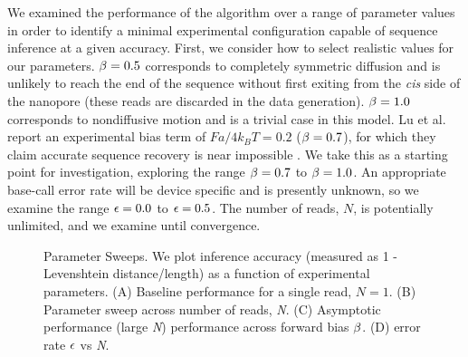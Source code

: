 \documentclass{biophys_letter}
\begin{document}
We examined the performance of the algorithm over a range of parameter values in order to identify a minimal experimental configuration capable of sequence inference at a given accuracy.
First, we consider how to select realistic values for our parameters.
$\beta=0.5$ corresponds to completely symmetric diffusion and is unlikely to reach the end of the sequence without first exiting from the {\it cis} side of the nanopore (these reads are discarded in the data generation).
$\beta=1.0$ corresponds to nondiffusive motion and is a trivial case in this model.
Lu et al. report an experimental bias term of $Fa/4k_{B}T=0.2$ ($\beta=0.7$), for which they claim accurate sequence recovery is near impossible \cite{Lu:2011}.
We take this as a starting point for investigation, exploring the range $\beta=0.7$ to $\beta=1.0$.
An appropriate base-call error rate will be device specific and is presently unknown, so we examine the range $\epsilon=0.0$ to $\epsilon=0.5$.
The number of reads, $N$, is potentially unlimited, and we examine until convergence.

\begin{figure}
  \caption{Parameter Sweeps. We plot inference accuracy (measured as 1 - Levenshtein distance/length) as a function of experimental parameters. (A) Baseline performance for a single read, $N=1$. (B) Parameter sweep across number of reads, \emph{N}. (C) Asymptotic performance (large \emph{N}) performance across forward bias $\beta$. (D) error rate $\epsilon$ vs \emph{N}.}
\label{fig:parameter_sweeps}
\end{figure}
\end{document}
